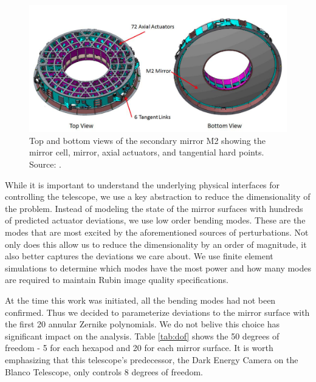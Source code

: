 \begin{figure}[hbt!]
\centering
\includegraphics[width=14cm, keepaspectratio]{figs/rubin_telescope_and_aos/M2actuators.png}
\caption[Rubin M2 Hexapod and Mechanical Actuators]{Top and bottom views of the secondary mirror M2 showing the mirror cell, mirror, axial actuators, and tangential hard points. Source: \cite{2016SPIE.9906E..67N}.}
\label{fig:m2act}
\end{figure}

While it is important to understand the underlying physical interfaces for controlling the telescope, we use a key abstraction to reduce the dimensionality of the problem. Instead of modeling the state of the mirror surfaces with hundreds of predicted actuator deviations, we use low order bending modes. These are the modes that are most excited by the aforementioned sources of perturbations. Not only does this allow us to reduce the dimensionality by an order of magnitude, it also better captures the deviations we care about. We use finite element simulations to determine which modes have the most power and how many modes are required to maintain Rubin image quality specifications. 

At the time this work was initiated, all the bending modes had not been confirmed. Thus we decided to parameterize deviations to the mirror surface with the first 20 annular Zernike polynomials. We do not belive this choice has significant impact on the analysis. Table \ref{tab:dof} shows the 50 degrees of freedom - 5 for each hexapod and 20 for each mirror surface. It is worth emphasizing that this telescope's predecessor, the Dark Energy Camera on the Blanco Telescope, only controls 8 degrees of freedom. 


